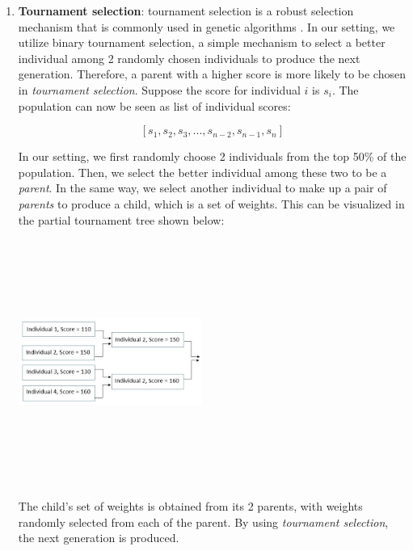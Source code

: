 \documentclass{article} %
\begin{document}
\begin{multicols}{2}
\begin{enumerate}
\item \textbf{Tournament selection}: tournament selection is a robust selection mechanism that is commonly used in genetic algorithms \cite{tournamentselection}. In our setting, we utilize binary tournament selection, a simple mechanism to select a better individual among 2 randomly chosen individuals to produce the next generation. Therefore, a parent with a higher score is more likely to be chosen in \textsl{tournament selection}. Suppose the score for individual $ i $ is $ s_i $. The population can now be seen as list of individual scores:

$$
[s_1, s_2, s_3, ..., s_{n-2}, s_{n-1}, s_n]
$$

In our setting, we first randomly choose 2 individuals from the top 50\% of the population. Then, we select the better individual among these two to be a \textsl{parent}. In the same way, we select another individual to make up a pair of \textsl{parents} to produce a child, which is a set of weights. This can be visualized in the partial tournament tree shown below:

\begin{center}
\includegraphics[width=6cm,height=8cm,keepaspectratio]{tournament.JPG}
\end{center}

The child's set of weights is obtained from its 2 parents, with weights randomly selected from each of the parent. By using \textsl{tournament selection}, the next generation is produced.



\end{enumerate}
\end{multicols}
\end{document}

